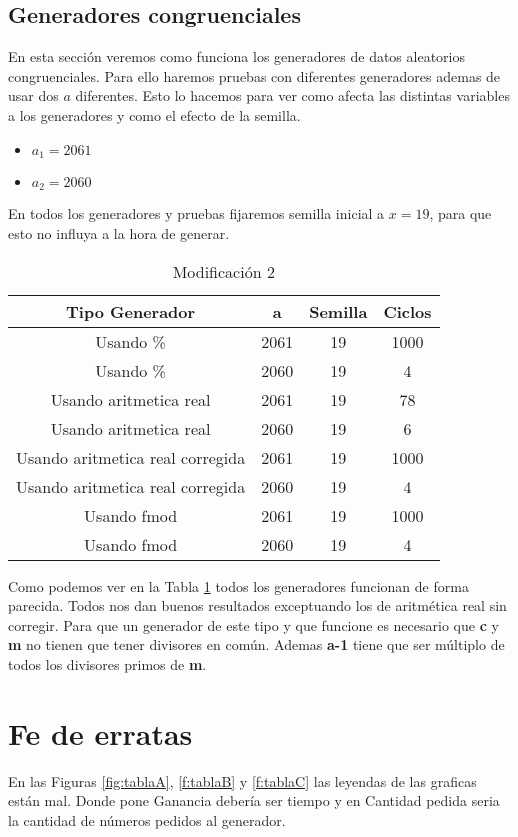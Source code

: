 \documentclass[12pt,a4paper]{article}
\begin{document}
\subsection{Generadores congruenciales}
En esta sección veremos como funciona los generadores de datos aleatorios congruenciales. Para ello haremos pruebas con diferentes generadores ademas de usar dos $a$ diferentes. Esto lo hacemos para ver como afecta las distintas variables a los generadores y como el efecto de la semilla. 
\begin{itemize}
	\item $a_1=2061$
	\item $a_2=2060$
\end{itemize}
En todos los generadores y pruebas fijaremos semilla inicial a $x=19$, para que esto no influya a la hora de generar.
\begin{table}[H]
	\begin{tabular}{cccc} \toprule
		{Tipo Generador} & {a} & {Semilla}& {Ciclos} \\ \midrule
		Usando \% & 2061  & 19 & 1000 \\
		Usando \% & 2060  & 19  & 4\\
		\midrule
		Usando aritmetica real & 2061  & 19 & 78 \\
		Usando aritmetica real & 2060  & 19  & 6\\
		\midrule
		Usando aritmetica real corregida & 2061  & 19 & 1000 \\
		Usando aritmetica real corregida & 2060  & 19  & 4\\
		\midrule
		Usando fmod & 2061  & 19 & 1000 \\
		Usando fmod & 2060  & 19  & 4\\
		\midrule
		
	\end{tabular}
	\caption{Modificación 2} \label{tab:congru}
\end{table}
Como podemos ver en la Tabla \ref{tab:congru} todos los generadores funcionan de forma parecida. Todos nos dan buenos resultados exceptuando los de aritmética real sin corregir.  Para que un generador de este tipo y que funcione es necesario que \textbf{c} y \textbf{m} no tienen que tener divisores en común. Ademas \textbf{a-1} tiene que ser múltiplo de todos los divisores primos de \textbf{m}. 
\section{Fe de erratas}
En las Figuras \ref{fig:tablaA}, \ref{f:tablaB} y \ref{f:tablaC} las leyendas de las graficas están mal. Donde pone Ganancia debería ser tiempo y en Cantidad pedida seria la cantidad de números pedidos al generador.
\end{document}
